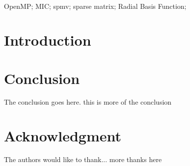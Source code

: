 \documentclass[10pt, conference, compsocconf]{IEEEtran}
\begin{document}
\begin{IEEEkeywords}
OpenMP; MIC; spmv; sparse matrix; Radial Basis Function;
\end{IEEEkeywords}

\IEEEpeerreviewmaketitle



\section{Introduction}
\cite{Bell08, Vuduc05, Nishtala07, Stock12-TACC, Cuthill69, cramer2012openmp, Buluc2009_SPAA, Buluc11, Im01, Mellor-Crummey04, Nishtala07, Saad94sparskit, Williams07}
\cite{Temam:1992:CBS:147877.148091}
\cite{DBLP:journals/ijhpca/ShantharamCR11,
conf/ppsc/Toledo97, Liu:2013:ESM:2464996.2465013, Molka:2009:MPC:1636712.1637764,%
DBLP:journals/corr/abs-1101-0091, conf/ipps/BulucWOD11, conf/ipps/KreutzerHWFBB12,%
kumar2012accelerating, journals/concurrency/VazquezFG11}










\section{Conclusion}
The conclusion goes here. this is more of the conclusion

\section*{Acknowledgment}


The authors would like to thank...
more thanks here



\end{document}
